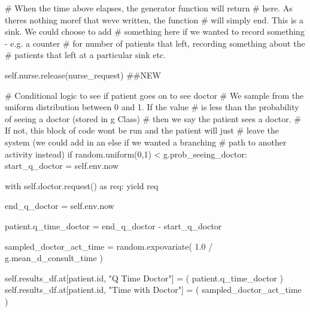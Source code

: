 \documentclass[
  letterpaper,
  DIV=11,
  numbers=noendperiod]{scrreprt}
\newenvironment{Shaded}{\begin{snugshade}}{\end{snugshade}}
\newcommand{\BuiltInTok}[1]{\textcolor[rgb]{0.00,0.23,0.31}{#1}}
\newcommand{\CommentTok}[1]{\textcolor[rgb]{0.37,0.37,0.37}{#1}}
\newcommand{\ControlFlowTok}[1]{\textcolor[rgb]{0.00,0.23,0.31}{#1}}
\newcommand{\DecValTok}[1]{\textcolor[rgb]{0.68,0.00,0.00}{#1}}
\newcommand{\FloatTok}[1]{\textcolor[rgb]{0.68,0.00,0.00}{#1}}
\newcommand{\ImportTok}[1]{\textcolor[rgb]{0.00,0.46,0.62}{#1}}
\newcommand{\NormalTok}[1]{\textcolor[rgb]{0.00,0.23,0.31}{#1}}
\newcommand{\OperatorTok}[1]{\textcolor[rgb]{0.37,0.37,0.37}{#1}}
\newcommand{\StringTok}[1]{\textcolor[rgb]{0.13,0.47,0.30}{#1}}
\newcommand{\VariableTok}[1]{\textcolor[rgb]{0.07,0.07,0.07}{#1}}
\begin{document}
\begin{tcolorbox}
\begin{Shaded}
\begin{Highlighting}[]
        \CommentTok{\# When the time above elapses, the generator function will return}
        \CommentTok{\# here.  As there\textquotesingle{}s nothing moref that we\textquotesingle{}ve written, the function}
        \CommentTok{\# will simply end.  This is a sink.  We could choose to add}
        \CommentTok{\# something here if we wanted to record something {-} e.g. a counter}
        \CommentTok{\# for number of patients that left, recording something about the}
        \CommentTok{\# patients that left at a particular sink etc.}

        \VariableTok{self}\NormalTok{.nurse.release(nurse\_request) }\CommentTok{\#\#NEW}

        \CommentTok{\# Conditional logic to see if patient goes on to see doctor}
        \CommentTok{\# We sample from the uniform distribution between 0 and 1.  If the value}
        \CommentTok{\# is less than the probability of seeing a doctor (stored in g Class)}
        \CommentTok{\# then we say the patient sees a doctor.}
        \CommentTok{\# If not, this block of code won\textquotesingle{}t be run and the patient will just}
        \CommentTok{\# leave the system (we could add in an else if we wanted a branching}
        \CommentTok{\# path to another activity instead)}
        \ControlFlowTok{if}\NormalTok{ random.uniform(}\DecValTok{0}\NormalTok{,}\DecValTok{1}\NormalTok{) }\OperatorTok{\textless{}}\NormalTok{ g.prob\_seeing\_doctor:}
\NormalTok{            start\_q\_doctor }\OperatorTok{=} \VariableTok{self}\NormalTok{.env.now}

            \ControlFlowTok{with} \VariableTok{self}\NormalTok{.doctor.request() }\ImportTok{as}\NormalTok{ req:}
                \ControlFlowTok{yield}\NormalTok{ req}

\NormalTok{                end\_q\_doctor }\OperatorTok{=} \VariableTok{self}\NormalTok{.env.now}

\NormalTok{                patient.q\_time\_doctor }\OperatorTok{=}\NormalTok{ end\_q\_doctor }\OperatorTok{{-}}\NormalTok{ start\_q\_doctor}

\NormalTok{                sampled\_doctor\_act\_time }\OperatorTok{=}\NormalTok{ random.expovariate(}
                    \FloatTok{1.0} \OperatorTok{/}\NormalTok{ g.mean\_d\_consult\_time}
\NormalTok{                )}

                \VariableTok{self}\NormalTok{.results\_df.at[patient.}\BuiltInTok{id}\NormalTok{, }\StringTok{"Q Time Doctor"}\NormalTok{] }\OperatorTok{=}\NormalTok{ (}
\NormalTok{                    patient.q\_time\_doctor}
\NormalTok{                )}
                \VariableTok{self}\NormalTok{.results\_df.at[patient.}\BuiltInTok{id}\NormalTok{, }\StringTok{"Time with Doctor"}\NormalTok{] }\OperatorTok{=}\NormalTok{ (}
\NormalTok{                    sampled\_doctor\_act\_time}
\NormalTok{                )}


\end{Highlighting}
\end{Shaded}
\end{tcolorbox}
\end{document}
